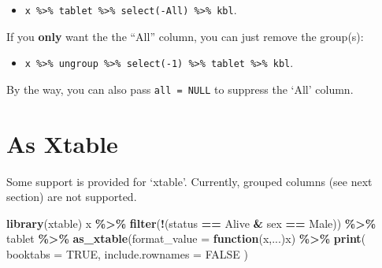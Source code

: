 \documentclass[
]{article}
\newenvironment{Shaded}{\begin{snugshade}}{\end{snugshade}}
\newcommand{\AttributeTok}[1]{\textcolor[rgb]{0.13,0.29,0.53}{#1}}
\newcommand{\ConstantTok}[1]{\textcolor[rgb]{0.56,0.35,0.01}{#1}}
\newcommand{\ControlFlowTok}[1]{\textcolor[rgb]{0.13,0.29,0.53}{\textbf{#1}}}
\newcommand{\FunctionTok}[1]{\textcolor[rgb]{0.13,0.29,0.53}{\textbf{#1}}}
\newcommand{\NormalTok}[1]{#1}
\newcommand{\SpecialCharTok}[1]{\textcolor[rgb]{0.81,0.36,0.00}{\textbf{#1}}}
\newcommand{\StringTok}[1]{\textcolor[rgb]{0.31,0.60,0.02}{#1}}
\providecommand{\tightlist}{%
  \setlength{\itemsep}{0pt}\setlength{\parskip}{0pt}}
\begin{document}
\begin{itemize}
\tightlist
\item
  \texttt{x\ \%\textgreater{}\%\ tablet\ \%\textgreater{}\%\ select(-All)\ \%\textgreater{}\%\ kbl}.
\end{itemize}

If you \textbf{only} want the the ``All'' column, you can just remove
the group(s):

\begin{itemize}
\tightlist
\item
  \texttt{x\ \%\textgreater{}\%\ ungroup\ \%\textgreater{}\%\ select(-1)\ \%\textgreater{}\%\ tablet\ \%\textgreater{}\%\ kbl}.
\end{itemize}

By the way, you can also pass \texttt{all\ =\ NULL} to suppress the
`All' column.

\section{As Xtable}\label{as-xtable}

Some support is provided for `xtable'. Currently, grouped columns (see
next section) are not supported.

\begin{Shaded}
\begin{Highlighting}[]
\FunctionTok{library}\NormalTok{(xtable)}
\NormalTok{  x }\SpecialCharTok{\%\textgreater{}\%} 
    \FunctionTok{filter}\NormalTok{(}\SpecialCharTok{!}\NormalTok{(status }\SpecialCharTok{==} \StringTok{\textquotesingle{}Alive\textquotesingle{}} \SpecialCharTok{\&}\NormalTok{ sex }\SpecialCharTok{==} \StringTok{\textquotesingle{}Male\textquotesingle{}}\NormalTok{)) }\SpecialCharTok{\%\textgreater{}\%}
\NormalTok{    tablet }\SpecialCharTok{\%\textgreater{}\%} \FunctionTok{as\_xtable}\NormalTok{(}\AttributeTok{format\_value =} \ControlFlowTok{function}\NormalTok{(x,...)x) }\SpecialCharTok{\%\textgreater{}\%} 
    \FunctionTok{print}\NormalTok{(}
      \AttributeTok{booktabs =} \ConstantTok{TRUE}\NormalTok{, }
      \AttributeTok{include.rownames =} \ConstantTok{FALSE} 
\NormalTok{    )}
\end{Highlighting}
\end{Shaded}
\end{document}
